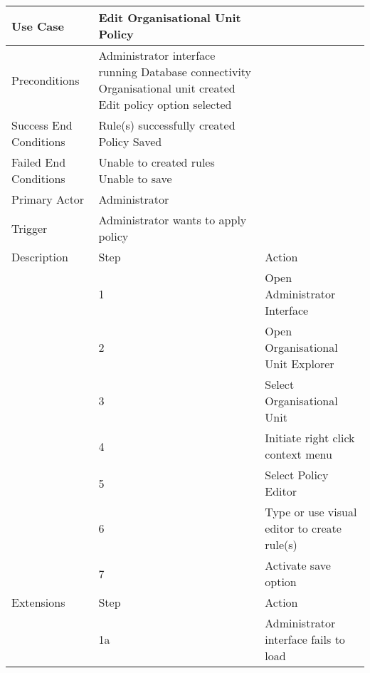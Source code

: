 	\begin{tablehere}
	
		\small{\begin{tabular}{ | p{35mm} | p{55mm} | p{50mm} |}
		\hline
		\textbf{Use Case}					& \textbf{Edit Organisational Unit Policy} 				&  																\\ \hline
		Preconditions	 	 	 			& Administrator interface running\newline	
											  Database connectivity\newline
											  Organisational unit created\newline					
											  Edit policy option selected 						    &   															\\ \hline
		Success End Conditions	 	 	 	& Rule(s) successfully created\newline
											  Policy Saved											&																\\ \hline
		Failed End Conditions	 	 	 	& Unable to created rules\newline
											  Unable to save										&																\\ \hline
		Primary Actor			 	 	 	& Administrator											&																\\ \hline
		Trigger			 	 	 	 		& Administrator wants to apply  policy					&																\\ \hline
		Description					 		& Step													&	Action														\\ \hline
											& 1														&	Open Administrator Interface									\\ \cline{2-3}
											& 2														&	Open Organisational Unit Explorer							\\ \cline{2-3}
											& 3														&	Select Organisational Unit 								\\ \cline{2-3}
											& 4														&	Initiate right click context menu							\\ \cline{2-3}
											& 5														&	Select Policy Editor										\\ \cline{2-3}
											& 6														&	Type or use visual editor to create rule(s)					\\ \cline{2-3}
											& 7														&	Activate save option										\\ \hline
		Extensions							& Step													&	Action														\\ \hline
											& 1a													&	Administrator interface fails to load						\\ \cline{2-3}

\end{tabular}}
\end{tablehere}
